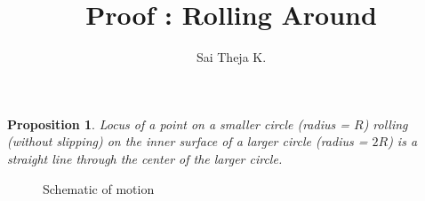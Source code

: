 \documentclass[12pt]{article}
\title{\vspace{-2cm} Proof : Rolling Around\vspace{-1.5ex}}
\author{Sai  Theja K.}
\date{}
\newtheorem{proposition}{Proposition}
\begin{document}
\maketitle
\vspace*{-3em}
\begin{proposition}
    Locus of a point on a smaller circle (radius = $R$) rolling (without slipping) on the inner surface of a larger circle (radius = $2R$) is a straight line through the center of the larger circle.
\end{proposition}

\begin{figure}[h]
    \centering
    \def\svgwidth{0.75\linewidth}
    \graphicspath{{../inkscape/tex_pdf/}} %
    \caption{Schematic of motion}
    \label{fig:schematic}
\end{figure}
\end{document}

